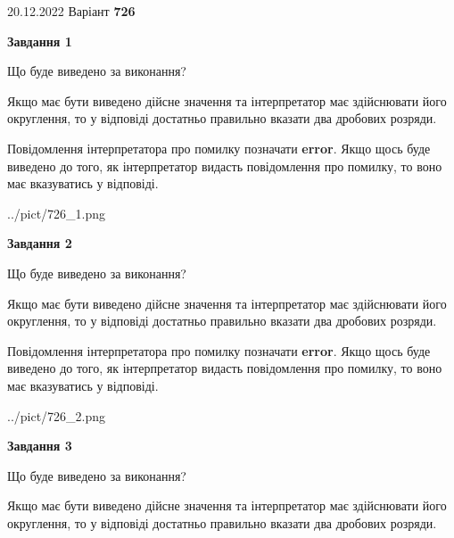 \documentclass[12pt, ukrainian]{article}
\begin{document}
{20.12.2022 Варіант \No \textbf { 726 }\par}
{
\begin {Large}

{\begin {center}\textbf{Завдання 1}\end {center}}\par
Що буде виведено за виконання? \par

Якщо має бути виведено дійсне значення та інтерпретатор має здійснювати його округлення, 
то у відповіді достатньо правильно вказати два дробових розряди.

Повідомлення інтерпретатора про помилку позначати \textbf{error}.
Якщо щось буде виведено до того, як інтерпретатор видасть повідомлення про помилку, 
то воно має вказуватись у відповіді. \par

\begin{center}
	{../pict/726_1.png}
\end{center}
\newpage

{\begin {center}\textbf{Завдання 2}\end {center}}\par
Що буде виведено за виконання? \par

Якщо має бути виведено дійсне значення та інтерпретатор має здійснювати його округлення, 
то у відповіді достатньо правильно вказати два дробових розряди.

Повідомлення інтерпретатора про помилку позначати \textbf{error}.
Якщо щось буде виведено до того, як інтерпретатор видасть повідомлення про помилку, 
то воно має вказуватись у відповіді. \par

\begin{center}
	{../pict/726_2.png}
\end{center}
\newpage

{\begin {center}\textbf{Завдання 3}\end {center}}\par
Що буде виведено за виконання? \par

Якщо має бути виведено дійсне значення та інтерпретатор має здійснювати його округлення, 
то у відповіді достатньо правильно вказати два дробових розряди.


\end{Large}}
\end{document}
